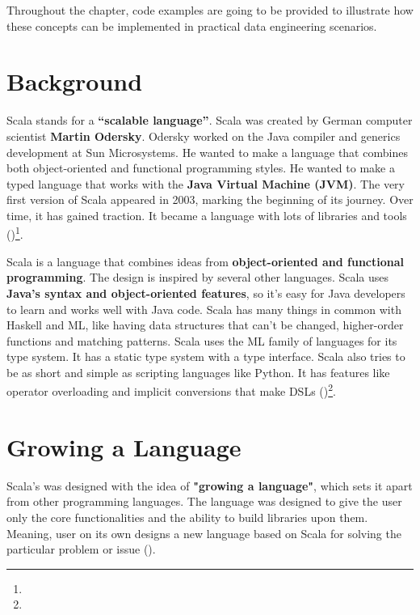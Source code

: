 Throughout the chapter, code examples are going to be provided to illustrate how these concepts can be implemented in practical data engineering scenarios.

\section{Background}

Scala stands for a \textbf{“scalable language”}. Scala was created by German computer scientist \textbf{Martin Odersky}. Odersky worked on the Java compiler and generics development at Sun Microsystems. He wanted to make a language that combines both object-oriented and functional programming styles. He wanted to make a typed language that works with the \textbf{Java Virtual Machine (JVM)}. The very first version of Scala appeared in 2003, marking the beginning of its journey. Over time, it has gained traction. It became a language with lots of libraries and tools (\cite{oderskyOverviewScalaProgramming2006})\footnote[1]{}.

Scala is a language that combines ideas from \textbf{object-oriented and functional programming}. The design is inspired by several other languages. Scala uses \textbf{Java's syntax and object-oriented features}, so it's easy for Java developers to learn and works well with Java code. Scala has many things in common with Haskell and ML, like having data structures that can't be changed, higher-order functions and matching patterns. Scala uses the ML family of languages for its type system. It has a static type system with a type interface. Scala also tries to be as short and simple as scripting languages like Python. It has features like operator overloading and implicit conversions that make DSLs (\cite{odersky.etal_2021})\footnote[2]{}.

\section{Growing a Language}

Scala's was designed with the idea of \textbf{"growing a language"}, which sets it apart from other programming languages. The language was designed to give the user only the core functionalities and the ability to build libraries upon them. Meaning, user on its own designs a new language based on Scala for solving the particular problem or issue (\cite{odersky.etal_2021})\footnotemark[2].

